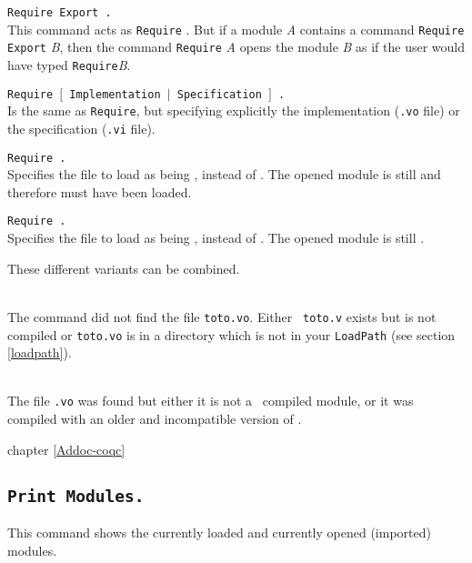 \begin{Variants}
\item {\tt Require Export {\ident}.}\\
  This command acts as {\tt Require} {\ident}.  But if a module {\it
    A} contains a command {\tt Require Export} {\it B}, then the
  command {\tt Require} {\it A} opens the module {\it B} as if the
  user would have typed {\tt Require}{\it B}.
\item {\tt Require $[$ Implementation $|$ Specification $]$ {\ident}.}\\
  Is the same as {\tt Require}, but specifying explicitly the
  implementation ({\tt.vo} file) or the specification ({\tt.vi}
  file).
\item {\tt Require {\ident} {\str}.}\\ 
  Specifies the file to load as being {\str}, instead of
  {\ident}. The opened module is still {\ident} and therefore
  must have been loaded.
\item {\tt Require {\ident} {\str}.}\\ 
  Specifies the file to load as being {\str}, instead of
  {\ident}. The opened module is still {\ident}.
\end{Variants}

These different variants can be combined.

\begin{ErrMsgs}
\item {}\\
  The command did not find the file {\tt toto.vo}. Either {\tt
    toto.v} exists but is not compiled or {\tt toto.vo} is in a directory
  which is not in your {\tt LoadPath} (see section \ref{loadpath}).
\item {}\\
  The file {\tt{\ident}.vo} was found but either it is not a \Coq\
  compiled module, or it was compiled with an older and incompatible
  version of \Coq.
\end{ErrMsgs}

\SeeAlso chapter \ref{Addoc-coqc}

\subsection{\tt Print Modules.}
This command shows the currently loaded and currently opened
(imported) modules.


